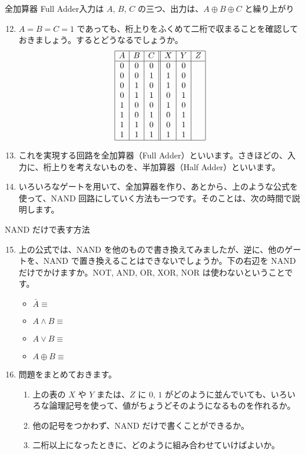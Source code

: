 \documentclass[10pt, dvipdfmx]{beamer}
\begin{document}
\begin{frame}{全加算器 Full Adder}{入力は \(A\),  \(B\), \(C\) の三つ、出力は、\(A\oplus B \oplus C\) と繰り上がり}
\begin{enumerate}
\setcounter{enumi}{11}
\item \(A = B = C = 1\) であっても、桁上りをふくめて二桁で収まることを確認しておきましょう。するとどうなるでしょうか。
\[ \begin{array}{|c|c|c||c|c|c|} \hline A  & B  & C  & X  & Y  & Z\\ \hline 0  & 0  & 0  & 0  & 0 & \\ 0  & 0  & 1  & 1  & 0 & \\ 0  & 1  & 0  & 1  & 0 & \\ 0  & 1  & 1  & 0  & 1 & \\ 1  & 0  & 0  & 1  & 0 & \\ 1  & 0  & 1  & 0  & 1 & \\ 1  & 1  & 0  & 0  & 1 & \\ 1  & 1  & 1  & 1  & 1 & \\ \hline \end{array} \]

\item これを実現する回路を全加算器（Full Adder）といいます。さきほどの、入力に、桁上りを考えないものを、半加算器（Half Adder）といいます。
\item いろいろなゲートを用いて、全加算器を作り、あとから、上のような公式を使って、NAND 回路にしていく方法も一つです。そのことは、次の時間で説明します。
\end{enumerate}
\end{frame}
\begin{frame}{NAND だけで表す方法}
\begin{enumerate}
\setcounter{enumi}{14}
\item 上の公式では、NAND を他のもので書き換えてみましたが、逆に、他のゲートを、NAND で置き換えることはできないでしょうか。下の右辺を NAND だけでかけますか。NOT, AND, OR, XOR, NOR は使わないということです。
\begin{itemize}
    \item \(\bar{A} \equiv\)
    \item \(A \land B \equiv\)
    \item \(A \lor B \equiv\)
    \item \(A \oplus B \equiv\)
\end{itemize}
\item 問題をまとめておきます。
\begin{enumerate}
\item 上の表の \(X\) や \(Y\) または、\(Z\) に \(0\), \(1\) がどのように並んでいても、いろいろな論理記号を使って、値がちょうどそのようになるものを作れるか。
\item 他の記号をつかわず、NAND だけで書くことができるか。
\item 二桁以上になったときに、どのように組み合わせていけばよいか。
\end{enumerate}
\end{enumerate}
\end{frame}
\end{document}
